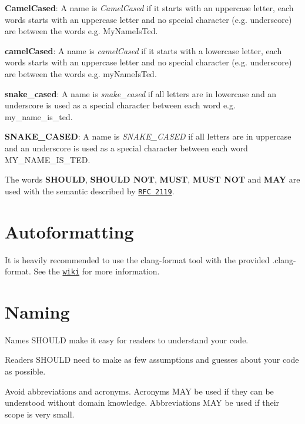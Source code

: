 \begin{DoxyItemize}
\item {\bfseries Camel\+Cased}\+: A name is {\itshape Camel\+Cased} if it starts with an uppercase letter, each words starts with an uppercase letter and no special character (e.\+g. underscore) are between the words e.\+g. My\+Name\+Is\+Ted.
\item {\bfseries camel\+Cased}\+: A name is {\itshape camel\+Cased} if it starts with a lowercase letter, each words starts with an uppercase letter and no special character (e.\+g. underscore) are between the words e.\+g. my\+Name\+Is\+Ted.
\item {\bfseries snake\+\_\+cased}\+: A name is {\itshape snake\+\_\+cased} if all letters are in lowercase and an underscore is used as a special character between each word e.\+g. my\+\_\+name\+\_\+is\+\_\+ted.
\item {\bfseries S\+N\+A\+K\+E\+\_\+\+C\+A\+S\+ED}\+: A name is {\itshape S\+N\+A\+K\+E\+\_\+\+C\+A\+S\+ED} if all letters are in uppercase and an underscore is used as a special character between each word M\+Y\+\_\+\+N\+A\+M\+E\+\_\+\+I\+S\+\_\+\+T\+ED.
\end{DoxyItemize}

The words {\bfseries S\+H\+O\+U\+LD}, {\bfseries S\+H\+O\+U\+LD N\+OT}, {\bfseries M\+U\+ST}, {\bfseries M\+U\+ST N\+OT} and {\bfseries M\+AY} are used with the semantic described by \href{https://www.ietf.org/rfc/rfc2119.txt}{\tt R\+FC 2119}.

\section*{Autoformatting}

It is heavily recommended to use the {\ttfamily clang-\/format} tool with the provided {\ttfamily .clang-\/format}. See the \href{https://github.com/Autonomous-Racing-PG/ros.package/wiki/Formatting-Cpp-and-Python-code}{\tt wiki} for more information.

\section*{Naming}

Names S\+H\+O\+U\+LD make it easy for readers to understand your code.

Readers S\+H\+O\+U\+LD need to make as few assumptions and guesses about your code as possible.

Avoid abbreviations and acronyms. Acronyms M\+AY be used if they can be understood without domain knowledge. Abbreviations M\+AY be used if their scope is very small.


